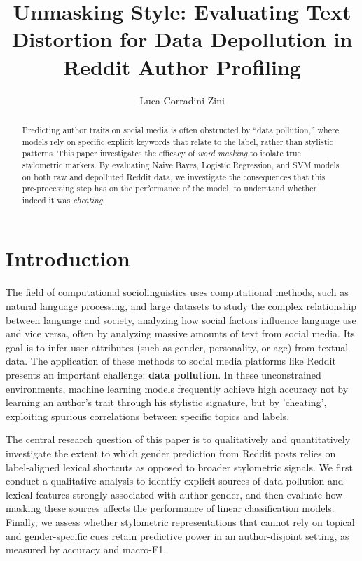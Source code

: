 \documentclass[11pt]{article}
\title{Unmasking Style: Evaluating Text Distortion for Data Depollution in Reddit Author Profiling}
\author{
  Luca Corradini Zini
}
\begin{document}
\maketitle
\thispagestyle{plain}

\begin{abstract}
Predicting author traits on social media is often obstructed by ``data pollution,'' where models rely on specific explicit keywords that relate to the label, rather than stylistic patterns. This paper investigates the efficacy of \textit{word masking} to isolate true stylometric markers. By evaluating Naive Bayes, Logistic Regression, and SVM models on both raw and depolluted Reddit data, we investigate the consequences that this pre-processing step has on the performance of the model, to understand whether indeed it was \textit{cheating}.
\end{abstract}

\section{Introduction}
The field of computational sociolinguistics uses computational methods, such as natural language processing, and large datasets to study the complex relationship between language and society, analyzing how social factors influence language use and vice versa, often by analyzing massive amounts of text from social media. Its goal is to infer user attributes (such as gender, personality, or age) from textual data. The application of these methods to social media platforms like Reddit presents an important challenge: \textbf{data pollution}. In these unconstrained environments, machine learning models frequently achieve high accuracy not by learning an author’s trait through his stylistic signature, but by 'cheating', exploiting spurious correlations between specific topics and labels.

The central research question of this paper is to qualitatively and quantitatively investigate the extent to which gender prediction from Reddit posts relies on label-aligned lexical shortcuts as opposed to broader stylometric signals. We first conduct a qualitative analysis to identify explicit sources of data pollution and lexical features strongly associated with author gender, and then evaluate how masking these sources affects the performance of linear classification models. Finally, we assess whether stylometric representations that cannot rely on topical and gender-specific cues retain predictive power in an author-disjoint setting, as measured by accuracy and macro-F1.
\end{document}
